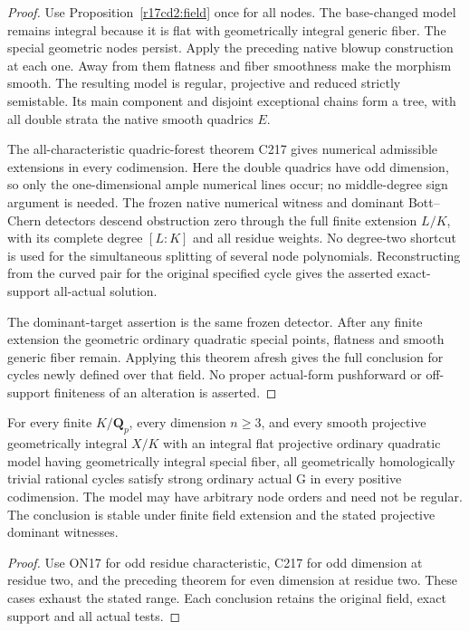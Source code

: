\begin{proof}
Use Proposition~\ref{r17cd2:field} once for all nodes.
The base-changed model remains integral because it is
flat with geometrically integral generic fiber.
The special geometric nodes persist. Apply the preceding
native blowup construction at each one. Away from them
flatness and fiber smoothness make the morphism smooth.
The resulting model is regular, projective and reduced
strictly semistable. Its main component and disjoint
exceptional chains form a tree, with all double strata
the native smooth quadrics $E$.

The all-characteristic quadric-forest theorem C217 gives
numerical admissible extensions in every codimension.
Here the double quadrics have odd dimension, so only
the one-dimensional ample numerical lines occur; no
middle-degree sign argument is needed. The frozen native
numerical witness and dominant Bott--Chern detectors
descend obstruction zero through the full finite extension
$L/K$, with its complete degree $[L:K]$ and all residue
weights. No degree-two shortcut is used for the simultaneous
splitting of several node polynomials. Reconstructing from
the curved pair for the original specified cycle gives
the asserted exact-support all-actual solution.

The dominant-target assertion is the same frozen detector.
After any finite extension the geometric ordinary
quadratic special points, flatness and smooth generic
fiber remain. Applying this theorem afresh gives the
full conclusion for cycles newly defined over that field.
No proper actual-form pushforward or off-support
finiteness of an alteration is asserted.
\end{proof}

\begin{corollary}
\label{r17cd2:all-primes}
For every finite $K/\mathbf Q_p$, every dimension $n\ge3$,
and every smooth projective geometrically integral $X/K$
with an integral flat projective ordinary quadratic model
having geometrically integral special fiber, all
geometrically homologically trivial rational cycles satisfy
strong ordinary actual G in every positive codimension.
The model may have arbitrary node orders and need not be
regular. The conclusion is stable under finite field
extension and the stated projective dominant witnesses.
\end{corollary}

\begin{proof}
Use ON17 for odd residue characteristic, C217 for odd
dimension at residue two, and the preceding theorem for
even dimension at residue two. These cases exhaust the
stated range. Each conclusion retains the original field,
exact support and all actual tests.
\end{proof}

